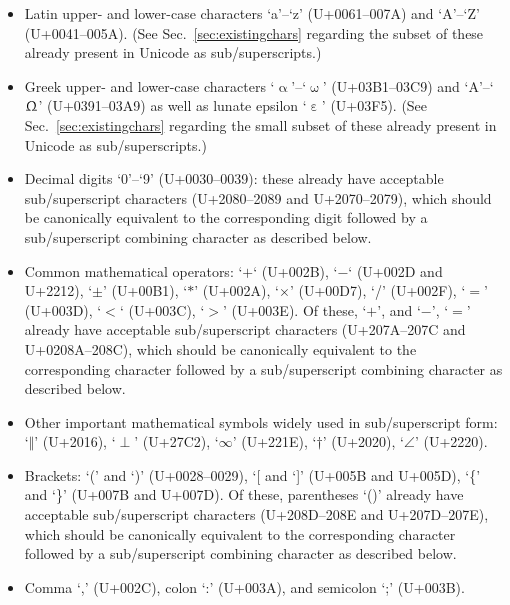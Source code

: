 \documentclass[10pt,english]{article}
\newcommand{\secref}[1]{Sec.~\ref{sec:#1}}
\begin{document}
\begin{itemize}

\item Latin upper- and lower-case characters `a'--`z' (U+0061--007A) and `A'--`Z' (U+0041--005A). (See \secref{existingchars} regarding the subset of these already present in Unicode as sub/superscripts.)

\item Greek upper- and lower-case characters `$\upalpha$'--`$\upomega$' (U+03B1--03C9) and `A'--`$\Upomega$' (U+0391--03A9) as well as lunate epsilon `$\upepsilon$' (U+03F5).   (See \secref{existingchars} regarding the small subset of these already present in Unicode as sub/superscripts.)

\item Decimal digits `0'--`9'  (U+0030--0039): these already have acceptable sub/superscript characters (U+2080--2089 and U+2070--2079), which should be canonically equivalent to the corresponding digit followed by a sub/superscript combining character as described below.

\item Common mathematical operators: `$+$` (U+002B), `$-$` (U+002D and U+2212), `$\pm$' (U+00B1), `$*$' (U+002A), `$\times$' (U+00D7), `/' (U+002F), `$=$' (U+003D), `$<$` (U+003C), `$>$' (U+003E).   Of these, `$+$', and `$-$', `$=$' already have acceptable sub/superscript characters (U+207A--207C and U+0208A--208C), which should be canonically equivalent to the corresponding character followed by a sub/superscript combining character as described below.

\item Other important mathematical symbols widely used in sub/superscript form: `$\Vert$'  (U+2016), `$\perp$' (U+27C2), `$\infty$' (U+221E), `$\dagger$' (U+2020), `$\angle$' (U+2220).

\item Brackets: `(' and `)' (U+0028--0029),  `[ and `]' (U+005B and U+005D), `\{' and `\}' (U+007B and U+007D).   Of these, parentheses `()' already have acceptable sub/superscript characters (U+208D--208E and U+207D--207E), which should be canonically equivalent to the corresponding character followed by a sub/superscript combining character as described below.

\item Comma `,' (U+002C), colon `:' (U+003A), and semicolon `;' (U+003B).

\end{itemize}
\end{document}
